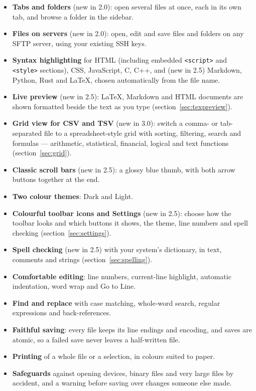 \documentclass[11pt,a4paper]{article}
\begin{document}
\begin{itemize}
  \item \textbf{Tabs and folders} (new in 2.0): open several files at once,
        each in its own tab, and browse a folder in the sidebar.
  \item \textbf{Files on servers} (new in 2.0): open, edit and save files
        and folders on any SFTP server, using your existing SSH keys.
  \item \textbf{Syntax highlighting} for HTML (including embedded
        \texttt{<script>} and \texttt{<style>} sections), CSS, JavaScript, C,
        C++, and (new in 2.5) Markdown, Python, Rust and \LaTeX, chosen
        automatically from the file name.
  \item \textbf{Live preview} (new in 2.5): \LaTeX, Markdown and HTML
        documents are shown formatted beside the text as you type
        (section~\ref{sec:texpreview}).
  \item \textbf{Grid view for CSV and TSV} (new in 3.0): switch a
        comma- or tab-separated file to a spreadsheet-style grid with
        sorting, filtering, search and formulas --- arithmetic, statistical,
        financial, logical and text functions (section~\ref{sec:grid}).
  \item \textbf{Classic scroll bars} (new in 2.5): a glossy blue thumb,
        with both arrow buttons together at the end.
  \item \textbf{Two colour themes}: Dark and Light.
  \item \textbf{Colourful toolbar icons and Settings} (new in 2.5): choose
        how the toolbar looks and which buttons it shows, the theme, line
        numbers and spell checking (section~\ref{sec:settings}).
  \item \textbf{Spell checking} (new in 2.5) with your system's dictionary,
        in text, comments and strings (section~\ref{sec:spelling}).
  \item \textbf{Comfortable editing}: line numbers, current-line highlight,
        automatic indentation, word wrap and Go to Line.
  \item \textbf{Find and replace} with case matching, whole-word search,
        regular expressions and back-references.
  \item \textbf{Faithful saving}: every file keeps its line endings and
        encoding, and saves are atomic, so a failed save never leaves a
        half-written file.
  \item \textbf{Printing} of a whole file or a selection, in colours suited
        to paper.
  \item \textbf{Safeguards} against opening devices, binary files and very
        large files by accident, and a warning before saving over changes
        someone else made.
\end{itemize}
\end{document}
